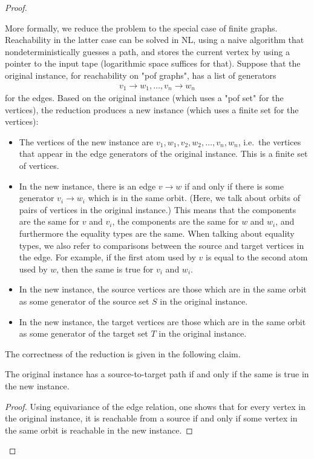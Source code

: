 \begin{proof}
\begin{itemize}
     More formally, we reduce the problem to the special case of finite graphs.  Reachability in the latter case can be solved in NL, using a naive algorithm that nondeterministically guesses a path, and stores the current vertex by using a pointer to the input tape (logarithmic space suffices for that). Suppose that the original instance, for reachability on "pof graphs", has a list of generators 
    \begin{align*}
    v_1 \to w_1, \ldots, v_n \to w_n
    \end{align*}
    for the edges.  Based on the original instance (which uses a "pof set" for the vertices), the 
     reduction produces a new instance (which uses a finite set for the vertices):
    \begin{itemize}
        \item The vertices of the new instance are $v_1,w_1,v_2,w_2,\ldots,v_n,w_n$, i.e.~the vertices that appear in the edge generators of the original instance. This is a finite set of vertices.
        \item  In the new instance, there is an edge $v \to w$ if  and only if there is some generator $v_i \to w_i$ which is in the same orbit. (Here, we talk about orbits of pairs of vertices in the original instance.) This means that the components are the same for $v$ and $v_i$, the components are the same for $w$ and $w_i$, and furthermore the  equality types are the same. When talking about equality types, we also refer to  comparisons between the source and target vertices in the edge.  For example, if the first atom used by $v$ is equal to the second atom used by $w$, then the same is true for $v_i$ and $w_i$.
        \item In the new instance, the source vertices are those which are in the same orbit as some generator of the source set $S$ in the original instance.
        \item In the new instance, the target vertices are those which are in the same orbit as some generator of the target set $T$ in the original instance.
    \end{itemize}
    The correctness of the reduction is given in the following claim.
    \begin{claim}
        The original instance has a source-to-target path if and only if the same is true in the new instance.
    \end{claim}
    \begin{proof}
        Using equivariance of the edge relation, 
        one shows that for every vertex in the original instance, it is reachable from a source if and only if some vertex in the same orbit is reachable in the new instance. 
    \end{proof}
      

\end{itemize}
\end{proof}
